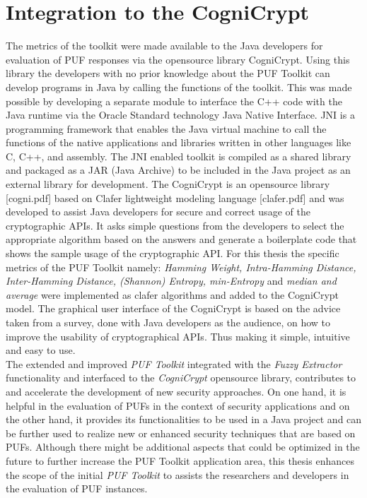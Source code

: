 \section{Integration to the CogniCrypt}
The metrics of the toolkit were made available to the Java developers for evaluation of PUF responses via the opensource library CogniCrypt. Using this library the developers with no prior knowledge about the PUF Toolkit can develop programs in Java by calling the functions of the toolkit. This was made possible by developing a separate module to interface the C++ code with the Java runtime via the Oracle Standard technology Java Native Interface. JNI is a programming
framework that enables the Java virtual machine to call the functions of the native applications and libraries written in other languages like C, C++, and assembly. The JNI enabled toolkit is compiled as a shared library and packaged as a JAR (Java Archive) to be included in the Java project as an external library for development. The CogniCrypt is an opensource library [cogni.pdf] based on Clafer lightweight modeling language [clafer.pdf] and was developed to assist Java developers for secure and correct usage of the cryptographic APIs. It asks
simple questions from the developers to select the appropriate algorithm based on the answers and generate a boilerplate code that shows the sample usage of the cryptographic API. For this thesis the specific metrics of the PUF Toolkit namely: \emph{Hamming Weight, Intra-Hamming Distance, Inter-Hamming Distance, (Shannon) Entropy, min-Entropy} and \emph{median and average} were implemented as clafer algorithms and added to the CogniCrypt model. The graphical user interface of the
CogniCrypt is based on the advice taken from a survey, done with Java developers as the audience, on how to improve the usability of cryptographical APIs. Thus making it simple, intuitive and easy to use.\\

The extended and improved \emph{PUF Toolkit} integrated with the \emph{Fuzzy Extractor} functionality and interfaced to the \emph{CogniCrypt} opensource library, contributes to and accelerate the development of new security approaches. On one hand, it is helpful in the evaluation of PUFs in the context of security applications and on the other hand, it provides its functionalities to be used in a Java project and can be further used to realize new or enhanced security techniques that
are based on PUFs. Although there might be additional aspects that could be optimized in the future to further increase the PUF Toolkit application area, this thesis enhances the scope of the initial \emph{PUF Toolkit} to assists the researchers and developers in the evaluation of PUF instances.

